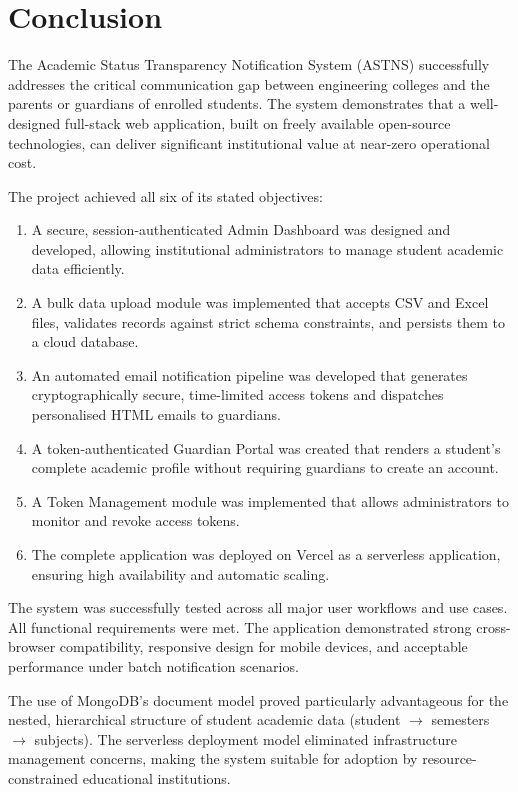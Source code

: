 \documentclass[12pt,a4paper]{report}
\begin{document}
\section{Conclusion}
The Academic Status Transparency Notification System (ASTNS) successfully addresses the critical communication gap between engineering colleges and the parents or guardians of enrolled students. The system demonstrates that a well-designed full-stack web application, built on freely available open-source technologies, can deliver significant institutional value at near-zero operational cost.

The project achieved all six of its stated objectives:
\begin{enumerate}
  \item A secure, session-authenticated Admin Dashboard was designed and developed, allowing institutional administrators to manage student academic data efficiently.
  \item A bulk data upload module was implemented that accepts CSV and Excel files, validates records against strict schema constraints, and persists them to a cloud database.
  \item An automated email notification pipeline was developed that generates cryptographically secure, time-limited access tokens and dispatches personalised HTML emails to guardians.
  \item A token-authenticated Guardian Portal was created that renders a student's complete academic profile without requiring guardians to create an account.
  \item A Token Management module was implemented that allows administrators to monitor and revoke access tokens.
  \item The complete application was deployed on Vercel as a serverless application, ensuring high availability and automatic scaling.
\end{enumerate}

The system was successfully tested across all major user workflows and use cases. All functional requirements were met. The application demonstrated strong cross-browser compatibility, responsive design for mobile devices, and acceptable performance under batch notification scenarios.

The use of MongoDB's document model proved particularly advantageous for the nested, hierarchical structure of student academic data (student $\rightarrow$ semesters $\rightarrow$ subjects). The serverless deployment model eliminated infrastructure management concerns, making the system suitable for adoption by resource-constrained educational institutions.
\end{document}
